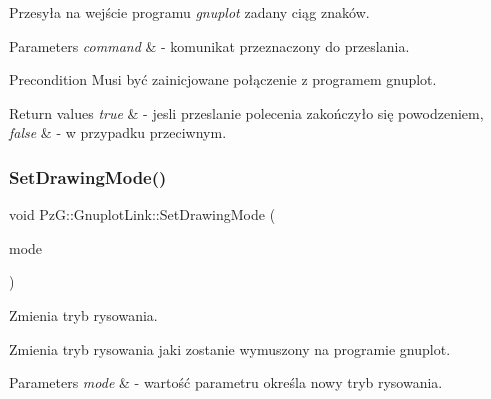 Przesyła na wejście programu {\itshape gnuplot} zadany ciąg znaków. 
\begin{DoxyParams}{Parameters}
{\em command} & -\/ komunikat przeznaczony do przeslania.\\
\hline
\end{DoxyParams}
\begin{DoxyPrecond}{Precondition}
Musi być zainicjowane połączenie z programem gnuplot.
\end{DoxyPrecond}

\begin{DoxyRetVals}{Return values}
{\em true} & -\/ jesli przeslanie polecenia zakończyło się powodzeniem, \\
\hline
{\em false} & -\/ w przypadku przeciwnym. \\
\hline
\end{DoxyRetVals}
\mbox{\label{class_pz_g_1_1_gnuplot_link_a5b903bc69eb4c2884edbe25d53cea188}} 
\subsubsection{\texorpdfstring{Set\+Drawing\+Mode()}{SetDrawingMode()}}
{\footnotesize\ttfamily void Pz\+G\+::\+Gnuplot\+Link\+::\+Set\+Drawing\+Mode (\begin{DoxyParamCaption}\item[{\hyperlink{namespace_pz_g_a4360c76a1dbf714a19a0d97fe56e0660}{Drawing\+Mode}}]{mode }\end{DoxyParamCaption})\hspace{0.3cm}{\ttfamily [inline]}}



Zmienia tryb rysowania. 

Zmienia tryb rysowania jaki zostanie wymuszony na programie {\ttfamily gnuplot}. 
\begin{DoxyParams}{Parameters}
{\em mode} & -\/ wartość parametru określa nowy tryb rysowania. \\
\hline
\end{DoxyParams}
\mbox{\label{class_pz_g_1_1_gnuplot_link_a7db1d889cd30bfb23cb4af3ca4bb4ef0}} 
